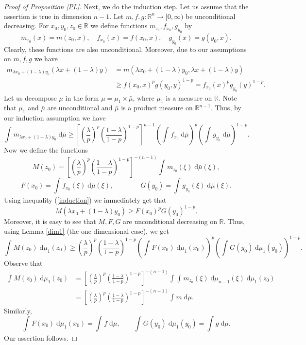 \documentclass[11pt]{article}
\newcommand{\call}[4]{\int_{#1}^{#2} {#3} \; \textrm{d} {#4}}
\newcommand{\mb}[1]{\mathbb{{#1}}}
\newcommand{\1}{\mathbf{{1}}}
\theoremstyle{definition}
\begin{document}
\begin{proof}[Proof of Proposition \ref{PL}]
Next, we do the induction step. Let us assume that the assertion is true in dimension $n-1$. Let $m,f,g:\mb{R}^{n} \to [0,\infty)$ be unconditional decreasing. For $x_0,y_0,z_0 \in \mb{R}$ we define functions $m_{z_0},f_{x_0}, g_{y_0}$ by
\[
m_{z_0}(x) = m(z_0, x), \quad f_{x_0}(x)=f(x_0,x), \quad g_{y_0}(x)=g(y_0,x).
\]
Clearly, these functions are also unconditional. Moreover, due to our assumptions on $m,f,g$ we have
\begin{align*}
	m_{\lambda x_0+(1-\lambda)y_0}(\lambda x + (1-\lambda)y) &= m(\lambda x_0+(1-\lambda)y_0, \lambda x + (1-\lambda)y) \\
	& \geq f(x_0,x)^p g(y_0,y)^{1-p} = f_{x_0}(x)^p g_{y_0}(y)^{1-p}.
\end{align*}
Let us decompose $\mu$ in the form $\mu=\mu_1 \times \bar{\mu}$, where $\mu_1$ is a measure on $\mb{R}$. Note that $\mu_1$ and $\bar{\mu}$ are unconditional and $\bar{\mu}$  is a product measure on $\mb{R}^{n-1}$.
Thus, by our induction assumption we have
\begin{equation}\label{induction}
	\call{}{}{m_{\lambda x_0 + (1-\lambda)y_0}}{\bar{\mu}} \geq  \left[\left( \frac{\lambda}{p} \right)^{p}  \left( \frac{1-\lambda}{1-p} \right)^{1-p} \right]^{n-1} \left( \call{}{}{f_{x_0}}{\bar{\mu}} \right)^p \left( \call{}{}{g_{y_0}}{\bar{\mu}} \right)^{1-p}.
\end{equation}
Now we define the functions
\begin{equation}\label{M}
	M(z_0)= \left[\left( \frac{\lambda}{p} \right)^{p}  \left( \frac{1-\lambda}{1-p} \right)^{1-p} \right]^{-(n-1)} \call{}{}{m_{z_0}(\xi)}{\bar{\mu}(\xi)},
\end{equation}	
\begin{equation}	\label{FG}
 F(x_0)= \call{}{}{f_{x_0}(\xi)}{\bar{\mu}(\xi)}, \qquad \qquad G(y_0)= \call{}{}{g_{y_0}(\xi)}{\bar{\mu}(\xi)}.
\end{equation}
Using inequality (\ref{induction}) we immediately get that
\[
M(\lambda x_0+(1-\lambda) y_0) \geq F(x_0)^p G(y_0)^{1-p}.
\]
Moreover, it is easy to see that $M,F,G$ are unconditional decreasing on $\mb{R}$. Thus,  using Lemma \ref{dim1} (the one-dimensional case), we get
\begin{equation}\label{1dimFGM}
	\call{}{}{M(z_0)}{\mu_1(z_0)} \geq \left( \frac{\lambda}{p} \right)^{p}  \left( \frac{1-\lambda}{1-p} \right)^{1-p} \left( \call{}{}{F(x_0)}{\mu_1(x_0)} \right)^p \left( \call{}{}{G(y_0)}{\mu_1(y_0)}\right)^{1-p}.
\end{equation}
Observe that
\begin{align*}
	\call{}{}{M(z_0)}{\mu_1(z_0)} & = \left[\left( \frac{\lambda}{p} \right)^{p}  \left( \frac{1-\lambda}{1-p} \right)^{1-p} \right]^{-(n-1)} \call{}{}{\call{}{}{m_{z_0}(\xi)}{\mu_{n-1}(\xi)}}{\mu_1(z_0)} \\
	& = \left[\left( \frac{\lambda}{p} \right)^{p}  \left( \frac{1-\lambda}{1-p} \right)^{1-p} \right]^{-(n-1)} \call{}{}{m}{\mu}.
\end{align*}
Similarly,
\[
	\call{}{}{F(x_0)}{\mu_1(x_0)}= \call{}{}{f}{\mu}, \qquad \call{}{}{G(y_0)}{\mu_1(y_0)}= \call{}{}{g}{\mu}.
\]
Our assertion follows.

\end{proof}
\end{document}
